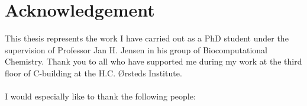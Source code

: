 \chapter*{Acknowledgement}

This thesis represents the work I have carried out as a PhD student under the supervision of Professor Jan H. Jensen in his group of Biocomputational Chemistry.
Thank you to all who have supported me during my work at the third floor of C-building at the H.C. Ørsteds Institute.
\\\\I would especially like to thank the following people:

